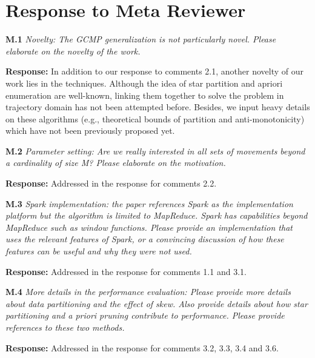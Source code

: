 \section{Response to Meta Reviewer}

\textbf{M.1} \emph{Novelty: The GCMP generalization is not particularly novel. Please elaborate on the novelty of the work.}

\textbf{Response:} In addition to our response to comments 2.1, another novelty of our work lies in the 
techniques. 
Although the idea of star partition and apriori enumeration are well-known, 
linking them together to solve the problem in trajectory domain has not been attempted before.
Besides, we input heavy details on these algorithms (e.g., theoretical bounds of partition and
anti-monotonicity) which have not been previously proposed yet.


\textbf{M.2} \emph{Parameter setting: Are we really interested in all sets of movements beyond a cardinality of size M? Please elaborate
on the motivation.}

\textbf{Response:} Addressed in the response for comments 2.2. 

\textbf{M.3} \emph{Spark implementation: the paper references Spark as the implementation platform but the algorithm is limited to MapReduce. Spark has capabilities beyond MapReduce such as window functions. Please provide an implementation that uses the relevant features of Spark, or a convincing discussion of how these features can be useful and why they were not used.}

\textbf{Response:} Addressed in the response for comments 1.1 and 3.1.

\textbf{M.4} \emph{More details in the performance evaluation: Please provide more details about data partitioning and the effect of skew. Also provide details about how star partitioning and a priori pruning contribute to performance. Please provide references to these two methods.}

\textbf{Response:} Addressed in the response for comments 3.2, 3.3, 3.4 and 3.6.
